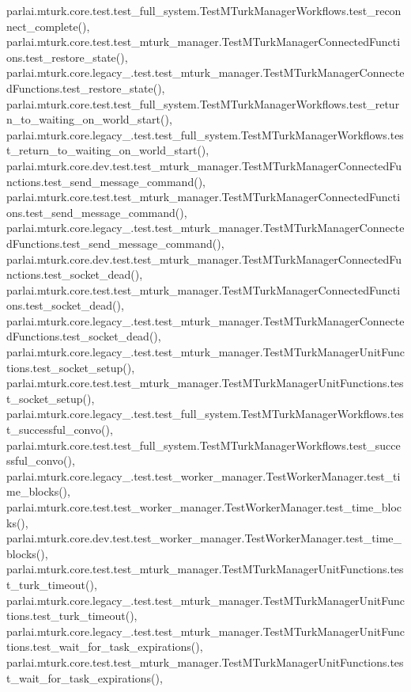 parlai.\+mturk.\+core.\+test.\+test\+\_\+full\+\_\+system.\+Test\+M\+Turk\+Manager\+Workflows.\+test\+\_\+reconnect\+\_\+complete(), parlai.\+mturk.\+core.\+test.\+test\+\_\+mturk\+\_\+manager.\+Test\+M\+Turk\+Manager\+Connected\+Functions.\+test\+\_\+restore\+\_\+state(), parlai.\+mturk.\+core.\+legacy\+\_.\+test.\+test\+\_\+mturk\+\_\+manager.\+Test\+M\+Turk\+Manager\+Connected\+Functions.\+test\+\_\+restore\+\_\+state(), parlai.\+mturk.\+core.\+test.\+test\+\_\+full\+\_\+system.\+Test\+M\+Turk\+Manager\+Workflows.\+test\+\_\+return\+\_\+to\+\_\+waiting\+\_\+on\+\_\+world\+\_\+start(), parlai.\+mturk.\+core.\+legacy\+\_.\+test.\+test\+\_\+full\+\_\+system.\+Test\+M\+Turk\+Manager\+Workflows.\+test\+\_\+return\+\_\+to\+\_\+waiting\+\_\+on\+\_\+world\+\_\+start(), parlai.\+mturk.\+core.\+dev.\+test.\+test\+\_\+mturk\+\_\+manager.\+Test\+M\+Turk\+Manager\+Connected\+Functions.\+test\+\_\+send\+\_\+message\+\_\+command(), parlai.\+mturk.\+core.\+test.\+test\+\_\+mturk\+\_\+manager.\+Test\+M\+Turk\+Manager\+Connected\+Functions.\+test\+\_\+send\+\_\+message\+\_\+command(), parlai.\+mturk.\+core.\+legacy\+\_.\+test.\+test\+\_\+mturk\+\_\+manager.\+Test\+M\+Turk\+Manager\+Connected\+Functions.\+test\+\_\+send\+\_\+message\+\_\+command(), parlai.\+mturk.\+core.\+dev.\+test.\+test\+\_\+mturk\+\_\+manager.\+Test\+M\+Turk\+Manager\+Connected\+Functions.\+test\+\_\+socket\+\_\+dead(), parlai.\+mturk.\+core.\+test.\+test\+\_\+mturk\+\_\+manager.\+Test\+M\+Turk\+Manager\+Connected\+Functions.\+test\+\_\+socket\+\_\+dead(), parlai.\+mturk.\+core.\+legacy\+\_.\+test.\+test\+\_\+mturk\+\_\+manager.\+Test\+M\+Turk\+Manager\+Connected\+Functions.\+test\+\_\+socket\+\_\+dead(), parlai.\+mturk.\+core.\+legacy\+\_.\+test.\+test\+\_\+mturk\+\_\+manager.\+Test\+M\+Turk\+Manager\+Unit\+Functions.\+test\+\_\+socket\+\_\+setup(), parlai.\+mturk.\+core.\+test.\+test\+\_\+mturk\+\_\+manager.\+Test\+M\+Turk\+Manager\+Unit\+Functions.\+test\+\_\+socket\+\_\+setup(), parlai.\+mturk.\+core.\+legacy\+\_.\+test.\+test\+\_\+full\+\_\+system.\+Test\+M\+Turk\+Manager\+Workflows.\+test\+\_\+successful\+\_\+convo(), parlai.\+mturk.\+core.\+test.\+test\+\_\+full\+\_\+system.\+Test\+M\+Turk\+Manager\+Workflows.\+test\+\_\+successful\+\_\+convo(), parlai.\+mturk.\+core.\+legacy\+\_.\+test.\+test\+\_\+worker\+\_\+manager.\+Test\+Worker\+Manager.\+test\+\_\+time\+\_\+blocks(), parlai.\+mturk.\+core.\+test.\+test\+\_\+worker\+\_\+manager.\+Test\+Worker\+Manager.\+test\+\_\+time\+\_\+blocks(), parlai.\+mturk.\+core.\+dev.\+test.\+test\+\_\+worker\+\_\+manager.\+Test\+Worker\+Manager.\+test\+\_\+time\+\_\+blocks(), parlai.\+mturk.\+core.\+test.\+test\+\_\+mturk\+\_\+manager.\+Test\+M\+Turk\+Manager\+Unit\+Functions.\+test\+\_\+turk\+\_\+timeout(), parlai.\+mturk.\+core.\+legacy\+\_.\+test.\+test\+\_\+mturk\+\_\+manager.\+Test\+M\+Turk\+Manager\+Unit\+Functions.\+test\+\_\+turk\+\_\+timeout(), parlai.\+mturk.\+core.\+legacy\+\_.\+test.\+test\+\_\+mturk\+\_\+manager.\+Test\+M\+Turk\+Manager\+Unit\+Functions.\+test\+\_\+wait\+\_\+for\+\_\+task\+\_\+expirations(), parlai.\+mturk.\+core.\+test.\+test\+\_\+mturk\+\_\+manager.\+Test\+M\+Turk\+Manager\+Unit\+Functions.\+test\+\_\+wait\+\_\+for\+\_\+task\+\_\+expirations(), 